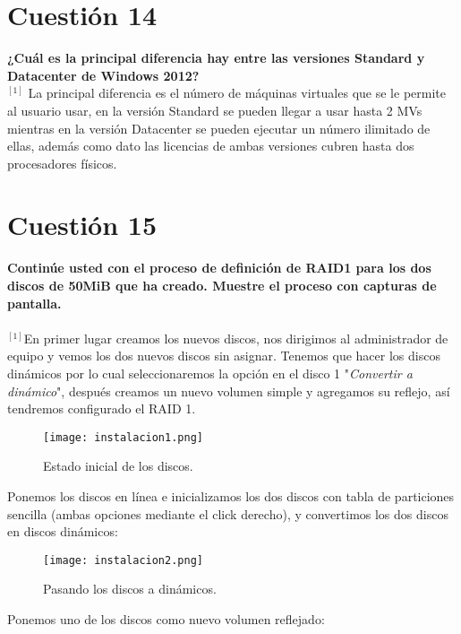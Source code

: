 \documentclass[a4paper, 11pt]{article} %
\begin{document}
\section{Cuestión 14}
\textbf{¿Cuál es la principal diferencia hay entre las versiones Standard y Datacenter de Windows 2012?}\\
$^{[1]}$ La principal diferencia es el número de máquinas virtuales que se le permite al usuario usar, en la versión Standard se pueden llegar a usar hasta 2 MVs mientras en la versión Datacenter se pueden ejecutar un número ilimitado de ellas, además como dato las licencias de ambas versiones cubren hasta dos procesadores físicos.

\pagebreak

\section{Cuestión 15}
\textbf{Continúe usted con el proceso de definición de RAID1 para los dos discos de 50MiB que ha creado. Muestre el proceso con capturas de pantalla.}\\ \\
$^{[1]}$En primer lugar creamos los nuevos discos, nos dirigimos al administrador de equipo y vemos los dos nuevos discos sin asignar. Tenemos que hacer los discos dinámicos por lo cual seleccionaremos la opción en el disco 1 "\textit{Convertir a dinámico}", después creamos un nuevo volumen simple y agregamos su reflejo, así tendremos configurado el RAID 1. 

\begin{figure}[h]
\centering 
\texttt{[image: instalacion1.png]} 
\caption{Estado inicial de los discos.} 
\vspace{-0.5cm}
\label{contexto:figura} 
\end{figure}

\pagebreak
Ponemos los discos en línea e inicializamos los dos discos con tabla de particiones sencilla (ambas opciones mediante el click derecho), y convertimos los dos discos en discos dinámicos:

\begin{figure}[h]
\centering 
\texttt{[image: instalacion2.png]} 
\caption{Pasando los discos a dinámicos.} 
\vspace{-0.2cm}
\label{contexto:figura} 
\end{figure}

\pagebreak
Ponemos uno de los discos como nuevo volumen reflejado:
\end{document}
